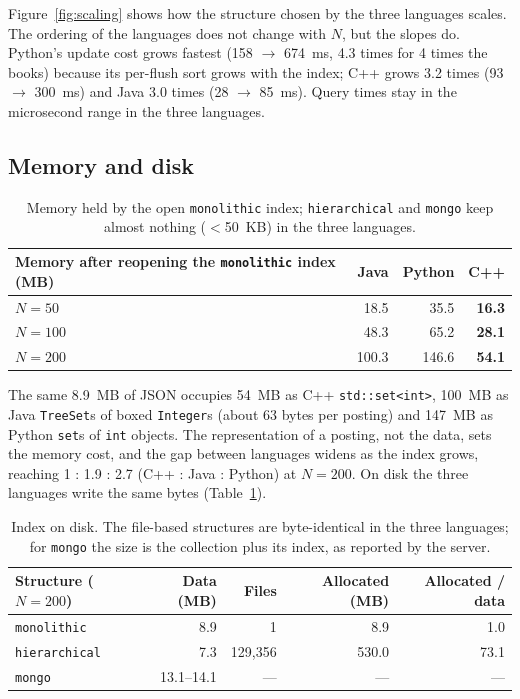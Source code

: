 \documentclass[11pt,a4paper]{article}
\newcommand{\code}[1]{\texttt{#1}}
\newcommand{\win}{\bfseries}   %
\begin{document}
Figure~\ref{fig:scaling} shows how the structure chosen by the three languages scales. The ordering
of the languages does not change with $N$, but the slopes do. Python's update cost grows fastest
(158 $\rightarrow$ 674~ms, 4.3 times for 4 times the books) because its per-flush sort grows with
the index; C++ grows 3.2 times (93 $\rightarrow$ 300~ms) and Java 3.0 times (28 $\rightarrow$
85~ms). Query times stay in the microsecond range in the three languages.

\subsection{Memory and disk}
\begin{table}[H]
\centering\small
\begin{tabular}{@{}lrrr@{}}
\toprule
Memory after reopening the \code{monolithic} index (MB) & Java & Python & C++ \\
\midrule
$N = 50$ & 18.5 & 35.5 & \win 16.3 \\
$N = 100$ & 48.3 & 65.2 & \win 28.1 \\
$N = 200$ & 100.3 & 146.6 & \win 54.1 \\
\bottomrule
\end{tabular}
\caption{Memory held by the open \code{monolithic} index; \code{hierarchical} and \code{mongo} keep
almost nothing ($<$50~KB) in the three languages.}
\end{table}

The same 8.9~MB of JSON occupies 54~MB as C++ \code{std::set<int>}, 100~MB as Java \code{TreeSet}s of
boxed \code{Integer}s (about 63 bytes per posting) and 147~MB as Python \code{set}s of \code{int}
objects. The representation of a posting, not the data, sets the memory cost, and the gap between
languages widens as the index grows, reaching 1 : 1.9 : 2.7 (C++ : Java : Python) at $N = 200$. On disk the three languages write the same bytes
(Table~\ref{tab:disk}).

\begin{table}[H]
\centering\small
\begin{tabular}{@{}lrrrr@{}}
\toprule
Structure ($N = 200$) & Data (MB) & Files & Allocated (MB) & Allocated / data \\
\midrule
\code{monolithic} & 8.9 & 1 & 8.9 & 1.0 \\
\code{hierarchical} & 7.3 & 129,356 & 530.0 & 73.1 \\
\code{mongo} & 13.1--14.1 & --- & --- & --- \\
\bottomrule
\end{tabular}
\caption{Index on disk. The file-based structures are byte-identical in the three languages; for
\code{mongo} the size is the collection plus its index, as reported by the server.}
\label{tab:disk}
\end{table}
\end{document}
